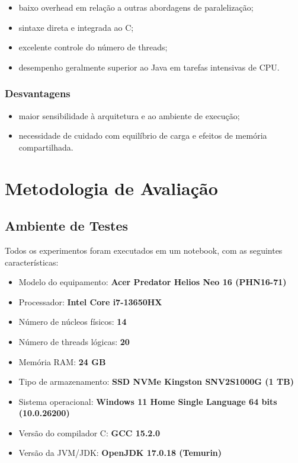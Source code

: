 \documentclass[10pt,twocolumn,a4paper]{article}
\begin{document}
\begin{itemize}[leftmargin=*]
    \item baixo overhead em relação a outras abordagens de paralelização;
    \item sintaxe direta e integrada ao C;
    \item excelente controle do número de threads;
    \item desempenho geralmente superior ao Java em tarefas intensivas de CPU.
\end{itemize}

\subsubsection{Desvantagens}

\begin{itemize}[leftmargin=*]
    \item maior sensibilidade à arquitetura e ao ambiente de execução;
    \item necessidade de cuidado com equilíbrio de carga e efeitos de memória compartilhada.
\end{itemize}

\section{Metodologia de Avaliação}

\subsection{Ambiente de Testes}

Todos os experimentos foram executados em um notebook, com as seguintes características:

\begin{itemize}[leftmargin=*]
    \item Modelo do equipamento: \textbf{Acer Predator Helios Neo 16 (PHN16-71)}
    \item Processador: \textbf{Intel Core i7-13650HX}
    \item Número de núcleos físicos: \textbf{14}
    \item Número de threads lógicas: \textbf{20}
    \item Memória RAM: \textbf{24 GB}
    \item Tipo de armazenamento: \textbf{SSD NVMe Kingston SNV2S1000G (1 TB)}
    \item Sistema operacional: \textbf{Windows 11 Home Single Language 64 bits (10.0.26200)}
    \item Versão do compilador C: \textbf{GCC 15.2.0}
    \item Versão da JVM/JDK: \textbf{OpenJDK 17.0.18 (Temurin)}
\end{itemize}
\end{document}
